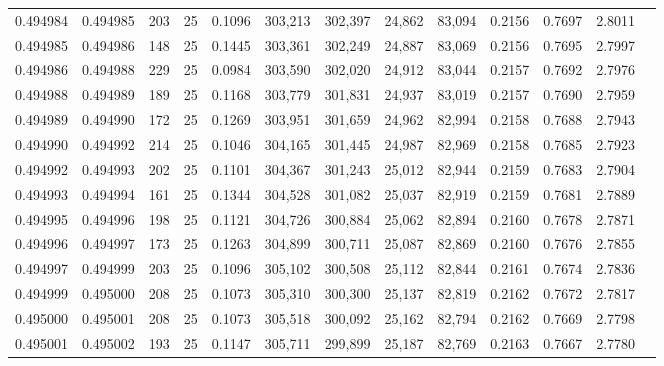 \begin{tabular}{rrrrrrrrrrrrr}
0.494984 & 0.494985 &   203 &  25 &                                     0.1096 & 303,213 & 302,397 &  24,862 &  83,094 & 0.2156 & 0.7697 & 2.8011 \\
0.494985 & 0.494986 &   148 &  25 &                                     0.1445 & 303,361 & 302,249 &  24,887 &  83,069 & 0.2156 & 0.7695 & 2.7997 \\
0.494986 & 0.494988 &   229 &  25 &                                     0.0984 & 303,590 & 302,020 &  24,912 &  83,044 & 0.2157 & 0.7692 & 2.7976 \\
0.494988 & 0.494989 &   189 &  25 &                                     0.1168 & 303,779 & 301,831 &  24,937 &  83,019 & 0.2157 & 0.7690 & 2.7959 \\
0.494989 & 0.494990 &   172 &  25 &                                     0.1269 & 303,951 & 301,659 &  24,962 &  82,994 & 0.2158 & 0.7688 & 2.7943 \\
0.494990 & 0.494992 &   214 &  25 &                                     0.1046 & 304,165 & 301,445 &  24,987 &  82,969 & 0.2158 & 0.7685 & 2.7923 \\
0.494992 & 0.494993 &   202 &  25 &                                     0.1101 & 304,367 & 301,243 &  25,012 &  82,944 & 0.2159 & 0.7683 & 2.7904 \\
0.494993 & 0.494994 &   161 &  25 &                                     0.1344 & 304,528 & 301,082 &  25,037 &  82,919 & 0.2159 & 0.7681 & 2.7889 \\
0.494995 & 0.494996 &   198 &  25 &                                     0.1121 & 304,726 & 300,884 &  25,062 &  82,894 & 0.2160 & 0.7678 & 2.7871 \\
0.494996 & 0.494997 &   173 &  25 &                                     0.1263 & 304,899 & 300,711 &  25,087 &  82,869 & 0.2160 & 0.7676 & 2.7855 \\
0.494997 & 0.494999 &   203 &  25 &                                     0.1096 & 305,102 & 300,508 &  25,112 &  82,844 & 0.2161 & 0.7674 & 2.7836 \\
0.494999 & 0.495000 &   208 &  25 &                                     0.1073 & 305,310 & 300,300 &  25,137 &  82,819 & 0.2162 & 0.7672 & 2.7817 \\
0.495000 & 0.495001 &   208 &  25 &                                     0.1073 & 305,518 & 300,092 &  25,162 &  82,794 & 0.2162 & 0.7669 & 2.7798 \\
0.495001 & 0.495002 &   193 &  25 &                                     0.1147 & 305,711 & 299,899 &  25,187 &  82,769 & 0.2163 & 0.7667 & 2.7780 \\

\end{tabular}
